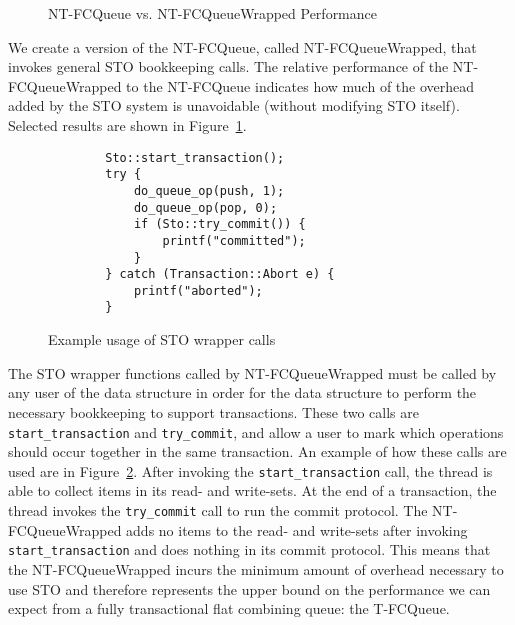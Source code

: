 \begin{figure}[H]
    \centering
	\begin{minipage}{0.75\textwidth}
        \caption*{Push-Pop Test (2 threads)}
        \vspace{12pt}
	\end{minipage}
   	\begin{minipage}{0.75\textwidth}
        \caption*{Multi-Thread Singletons Test}
	\end{minipage}
        \caption{NT-FCQueue vs. NT-FCQueueWrapped Performance}
    \label{fig:wrappedqs}
\end{figure}

We create a version of the NT-FCQueue, called NT-FCQueueWrapped, that invokes general STO bookkeeping calls. The relative performance of the NT-FCQueueWrapped to the NT-FCQueue indicates how much of the overhead added by the STO system is unavoidable (without modifying STO itself). 
Selected results are shown in Figure~\ref{fig:wrappedqs}.

\begin{figure}[H]
\centering
\singlespace
{}
	\begin{lstlisting}
		Sto::start_transaction();
		try {
			do_queue_op(push, 1);
			do_queue_op(pop, 0);
			if (Sto::try_commit()) {
				printf("committed");
			}
		} catch (Transaction::Abort e) {
			printf("aborted");
		}
	\end{lstlisting}
\caption{Example usage of STO wrapper calls}
\label{fig:wrappers}
\end{figure}

The STO wrapper functions called by NT-FCQueueWrapped must be called by any user of the data structure in order for the data structure to perform the necessary bookkeeping to support transactions.
These two calls are \texttt{start\_transaction} and \texttt{try\_commit}, and allow a user to mark which operations should occur together in the same transaction. An example of how these calls are used are in Figure~\ref{fig:wrappers}. After invoking the \texttt{start\_transaction} call, the thread is able to collect items in its read- and write-sets. At the end of a transaction, the thread invokes the \texttt{try\_commit} call to run the commit protocol. The NT-FCQueueWrapped adds no items to the read- and write-sets after invoking \texttt{start\_transaction} and does nothing in its commit protocol. This means that the NT-FCQueueWrapped incurs the minimum amount of overhead necessary to use STO and therefore represents the upper bound on the performance we can expect from a fully transactional flat combining queue: the T-FCQueue. 

